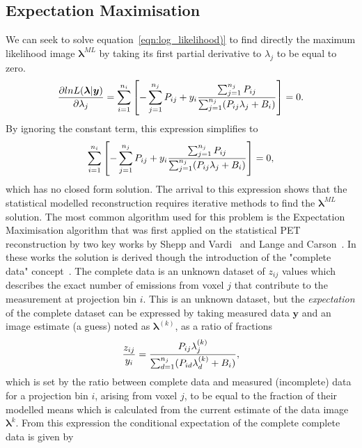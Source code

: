 \subsection{Expectation Maximisation}
We can seek to solve equation~\ref{eqn:log_likelihood)} to find directly the maximum likelihood image $\bm{\lambda}^{ML}$ by taking its first partial derivative to $\lambda_j$ to be equal to zero. 
\begin{equation}
\frac{\partial lnL(\bm{\lambda}|\bm{y})}{\partial \lambda_j} = \sum_{i=1}^{n_i}\left[  -\sum_{j=1}^{n_j} P_{ij} + 
y_i \frac{\sum_{j=1}^{n_j} P_{ij} }{\sum_{j=1}^{n_j} (P_{ij} \lambda_j + B_i)}
\right]  = 0 \\. 
\end{equation}
By ignoring the constant term, this expression simplifies to 
\begin{equation}
\sum_{i=1}^{n_i}\left[  -\sum_{j=1}^{n_j} P_{ij} + 
y_i \frac{\sum_{j=1}^{n_j} P_{ij} }{\sum_{j=1}^{n_j} (P_{ij} \lambda_j + B_i)} \right]  = 0 \\,
\end{equation}
which has no closed form solution. The arrival to this expression shows that the statistical modelled reconstruction requires iterative methods to find the $\bm{\lambda}^{ML}$ solution. The most common algorithm used for this problem is the Expectation Maximisation algorithm that was first applied on the statistical PET reconstruction by two key works by Shepp and Vardi~\cite{Vardi1985} and Lange and Carson~\cite{Lange1984}. In these works the solution is derived though the introduction of the "complete data" concept~\cite{Dempster1977}. The complete data is an unknown dataset of $z_{ij}$ values which describes the exact number of emissions from voxel $j$ that contribute to the measurement at projection bin $i$. This is an unknown dataset, but the \textit{expectation} of the complete dataset can be expressed by taking measured data $\bm{y}$ and an image estimate (a guess) noted as $\bm{\lambda}^{(k)}$, as a ratio of fractions
\begin{equation}
\frac{z_{ij}}{y_i} = 
\frac{P_{ij} \lambda_j^{(k)}}{\sum_{d=1}^{n_j} (P_{id}\lambda_d^{(k)} + B_i)} \\,
\end{equation}
which is set by the ratio between complete data and measured (incomplete) data for a projection bin $i$, arising from voxel $j$, to be equal to the fraction of their modelled means which is calculated from the current estimate of the data image  $\bm{\lambda}^k$. From this expression the conditional expectation of the complete complete data is given by
